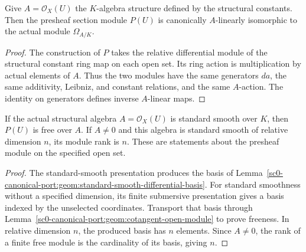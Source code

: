 \begin{lemma}
\label{sc0-canonical-port:geom:cotangent-open-module}
\leanok
Give \(A=\mathcal O_X(U)\) the \(K\)-algebra structure
defined by the structural constants. Then the presheaf section
module \(P(U)\) is canonically \(A\)-linearly isomorphic to
the actual module \(\Omega_{A/K}\).
\end{lemma}
\begin{proof}
The construction of \(P\) takes the relative differential module
of the structural constant ring map on each open set. Its ring
action is multiplication by actual elements of \(A\). Thus the
two modules have the same generators \(da\), the same additivity,
Leibniz, and constant relations, and the same \(A\)-action.
The identity on generators defines inverse \(A\)-linear maps.
\end{proof}

\begin{theorem}
\label{sc0-canonical-port:geom:cotangent-presheaf-smooth-rank}
\leanok
If the actual structural algebra \(A=\mathcal O_X(U)\) is
standard smooth over \(K\), then \(P(U)\) is free over \(A\).
If \(A\ne0\) and this algebra is standard smooth of relative
dimension \(n\), its module rank is \(n\).
These are statements about the presheaf module on the specified
open set.
\end{theorem}
\begin{proof}
The standard-smooth presentation produces the basis of
Lemma~\ref{sc0-canonical-port:geom:standard-smooth-differential-basis}. For standard
smoothness without a specified dimension, its finite submersive
presentation gives a basis indexed by the unselected coordinates.
Transport that basis through Lemma~\ref{sc0-canonical-port:geom:cotangent-open-module}
to prove freeness. In relative dimension \(n\), the produced
basis has \(n\) elements. Since \(A\ne0\), the rank of a
finite free module is the cardinality of its basis, giving \(n\).
\end{proof}

